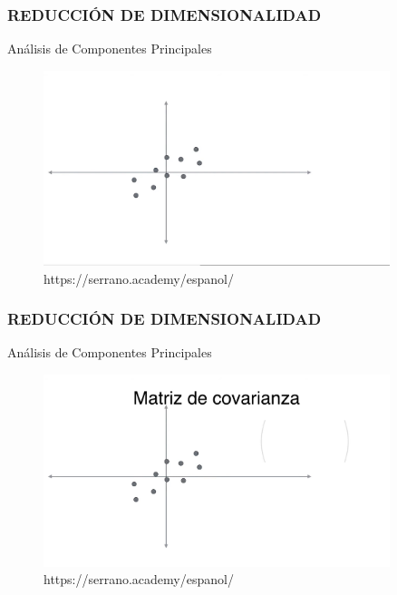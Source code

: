 \documentclass{beamer}
\begin{document}
\begin{frame}
\frametitle{REDUCCIÓN DE DIMENSIONALIDAD}
\begin{block}{Análisis de Componentes Principales}	
	\begin{figure}
		\includegraphics[width=0.9\textwidth]{PCA/IMG_3564.jpg}
		\caption{https://serrano.academy/espanol/}
	\end{figure}
\end{block}
\end{frame}

\begin{frame}
\frametitle{REDUCCIÓN DE DIMENSIONALIDAD}
\begin{block}{Análisis de Componentes Principales}	
	\begin{figure}
		\includegraphics[width=0.9\textwidth]{PCA/IMG_3565.jpg}
		\caption{https://serrano.academy/espanol/}
	\end{figure}
\end{block}
\end{frame}
\end{document}
